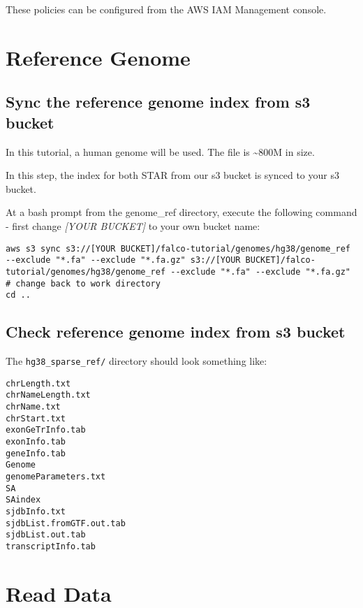 \documentclass[]{book}
\begin{document}
These policies can be configured from the AWS IAM Management console.

\hypertarget{reference-genome}{%
\chapter{Reference Genome}\label{reference-genome}}

\hypertarget{sync-the-reference-genome-index-from-s3-bucket}{%
\section{Sync the reference genome index from s3 bucket}\label{sync-the-reference-genome-index-from-s3-bucket}}

In this tutorial, a human genome will be used. The file is \textasciitilde800M in size.

In this step, the index for both STAR from our s3 bucket is synced to your s3 bucket.

At a bash prompt from the genome\_ref directory, execute the following command - first change \emph{{[}YOUR BUCKET{]}} to your own bucket name:

\begin{verbatim}
aws s3 sync s3://[YOUR BUCKET]/falco-tutorial/genomes/hg38/genome_ref --exclude "*.fa" --exclude "*.fa.gz" s3://[YOUR BUCKET]/falco-tutorial/genomes/hg38/genome_ref --exclude "*.fa" --exclude "*.fa.gz"
# change back to work directory
cd ..
\end{verbatim}

\hypertarget{check-reference-genome-index-from-s3-bucket}{%
\section{Check reference genome index from s3 bucket}\label{check-reference-genome-index-from-s3-bucket}}

The \texttt{hg38\_sparse\_ref/} directory should look something like:

\begin{verbatim}
chrLength.txt
chrNameLength.txt
chrName.txt
chrStart.txt
exonGeTrInfo.tab
exonInfo.tab
geneInfo.tab
Genome
genomeParameters.txt
SA
SAindex
sjdbInfo.txt
sjdbList.fromGTF.out.tab
sjdbList.out.tab
transcriptInfo.tab
\end{verbatim}

\hypertarget{read-data}{%
\chapter{Read Data}\label{read-data}}
\end{document}
